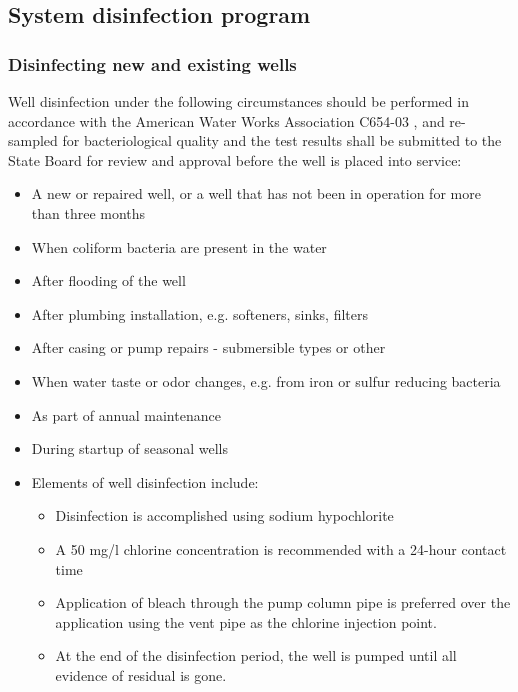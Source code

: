 \subsection{System disinfection program} 
\subsubsection{Disinfecting new and existing wells} 
Well disinfection under the following circumstances should be performed in accordance with the American Water Works Association C654-03 , and re-sampled for bacteriological quality and the test results shall be submitted to the State Board for review and approval before the well is placed into service: \\
\begin{itemize}
\item A new or repaired well, or a well that has not been in operation for more than three months
\item When coliform bacteria are present in the water
\item After flooding of the well
\item After plumbing installation, e.g. softeners, sinks, filters
\item After casing or pump repairs - submersible types or other
\item When water taste or odor changes, e.g. from iron or sulfur reducing bacteria
\item As part of annual maintenance
\item During startup of seasonal wells
\item Elements of well disinfection include:
\begin{itemize}
\item Disinfection is accomplished using sodium hypochlorite
\item A 50 mg/l chlorine concentration is recommended with a 24-hour contact time
\item Application of bleach through the pump column pipe is preferred over the application using the vent pipe as the chlorine injection point.
\item At the end of the disinfection period, the well is pumped until all evidence of residual is gone.
\end{itemize}
\end{itemize}

